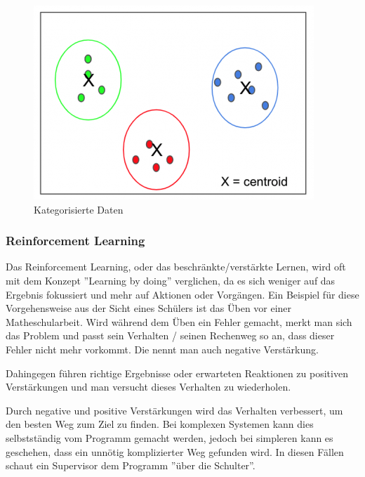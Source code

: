 \begin{figure}[ht]
    \centering
    \includegraphics[scale=0.8]{sections/machine-learning/images/clustered-data.png}
    \caption{Kategorisierte Daten}
    \label{fig:clustered-data}
\end{figure}

\subsubsection{Reinforcement Learning}

Das Reinforcement Learning, oder das beschränkte/verstärkte Lernen, wird oft mit dem Konzept ''Learning by doing'' verglichen, da es sich weniger auf das Ergebnis fokussiert und mehr auf Aktionen oder Vorgängen. Ein Beispiel für diese Vorgehensweise aus der Sicht eines Schülers ist das Üben vor einer Matheschularbeit. Wird während dem Üben ein Fehler gemacht, merkt man sich das Problem und passt sein Verhalten / seinen Rechenweg so an, dass dieser Fehler nicht mehr vorkommt. Die nennt man auch negative Verstärkung. \cite{SL:online}

Dahingegen führen richtige Ergebnisse oder erwarteten Reaktionen zu positiven Verstärkungen und man versucht dieses Verhalten zu wiederholen.

Durch negative und positive Verstärkungen wird das Verhalten verbessert, um den besten Weg zum Ziel zu finden. Bei komplexen Systemen kann dies selbstständig vom Programm gemacht werden, jedoch bei simpleren kann es geschehen, dass ein unnötig komplizierter Weg gefunden wird. In diesen Fällen schaut ein Supervisor dem Programm ''über die Schulter''.
